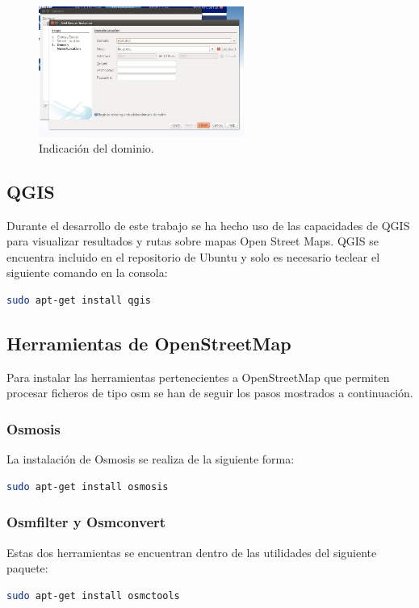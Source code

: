 \begin{figure}[h]
  \centering
    \includegraphics[width=0.6\textwidth]{../img/instalacion/sv3.jpg}
  \caption{Indicación del dominio.}
  \label{sv3}
\end{figure}

\subsection{QGIS}

Durante el desarrollo de este trabajo se ha hecho uso de las capacidades de QGIS para visualizar resultados y rutas sobre mapas Open Street Maps. QGIS se encuentra incluido en el repositorio de Ubuntu y solo es necesario teclear el siguiente comando en la consola:

\begin{lstlisting}[language=bash]
	sudo apt-get install qgis
\end{lstlisting}

\subsection{Herramientas de OpenStreetMap}
Para instalar las herramientas pertenecientes a OpenStreetMap que permiten procesar ficheros de tipo osm se han de seguir los pasos mostrados a continuación.

\subsubsection{Osmosis}
La instalación de Osmosis se realiza de la siguiente forma:
\begin{lstlisting}[language=bash]
	sudo apt-get install osmosis
\end{lstlisting}

\subsubsection{Osmfilter y Osmconvert}
Estas dos herramientas se encuentran dentro de las utilidades del siguiente paquete:
\begin{lstlisting}[language=bash]
	sudo apt-get install osmctools
\end{lstlisting}

